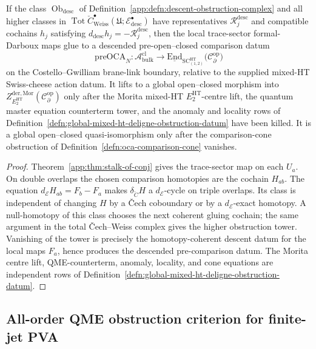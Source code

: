\begin{thm}\label{app:thm:global-stalk-from-collapse}
If the class \(\operatorname{Ob}_{\mathrm{desc}}\) of
Definition~\ref{app:defn:descent-obstruction-complex} and all higher
classes in
\(\operatorname{Tot}\check C^\bullet_{\mathrm{Weiss}}
(\mathfrak U;\mathcal E^\bullet_{\mathrm{desc}})\) have representatives
\(\mathcal R^{\mathrm{desc}}_j\) and compatible cochains \(h_j\)
satisfying \(d_{\mathrm{desc}}h_j=-\mathcal R^{\mathrm{desc}}_j\), then
the local trace-sector
formal-Darboux maps glue to a descended pre-open--closed comparison
datum
\[
  \mathrm{preOCA}_N\colon
   \mathcal A^{\mathrm{cl}}_{\mathrm{bulk}}
   \longrightarrow
   \underline{\mathrm{End}}_{\mathrm{SC}^{\mathrm{HT}}_{(1,2)}}\!
   \bigl(\mathcal{C}^{\mathrm{op}}_\partial\bigr)
\]
on the Costello--Gwilliam brane-link boundary, relative to the supplied
mixed-HT Swiss-cheese action datum.  It lifts to a global
open--closed morphism into
\(Z^{\mathrm{der},\mathrm{Mor}}_{E_2^{\mathrm{HT}}}
(\mathcal C^{\mathrm{op}}_\partial)\) only after the Morita mixed-HT
\(E_2^{\mathrm{HT}}\)-centre lift, the quantum master equation counterterm tower, and
the anomaly and locality rows of
Definition~\ref{defn:global-mixed-ht-deligne-obstruction-datum} have
been killed.  It is a global open--closed quasi-isomorphism only after
the comparison-cone obstruction of
Definition~\ref{defn:oca-comparison-cone} vanishes.
\end{thm}

\begin{proof}
Theorem~\ref{app:thm:stalk-of-conj} gives the trace-sector map on
each \(U_a\).  On double overlaps the chosen comparison homotopies are
the cochain \(H_{ab}\).  The equation
\(d_{\mathcal E}H_{ab}=F_b-F_a\) makes \(\delta_{\check C}H\) a
\(d_{\mathcal E}\)-cycle on triple overlaps.  Its class is independent
of changing \(H\) by a Čech coboundary or by a
\(d_{\mathcal E}\)-exact homotopy.  A null-homotopy of this class
chooses the next coherent gluing cochain; the same argument in the
total Čech--Weiss complex gives the higher obstruction tower.  Vanishing
of the tower is precisely the homotopy-coherent descent datum for the
local maps \(F_a\), hence produces the descended pre-comparison datum.
The Morita centre lift, QME-counterterm, anomaly, locality, and cone equations are
independent rows of
Definition~\ref{defn:global-mixed-ht-deligne-obstruction-datum}.
\end{proof}

\subsection{All-order QME obstruction criterion for finite-jet PVA}\label{app:hfc:all-order-qme}

